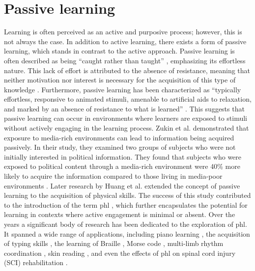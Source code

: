 \section{Passive learning}
Learning is often perceived as an active and purposive process; however, this is not always the case. In addition to active learning, there exists a form of passive learning, which stands in contrast to the active approach. Passive learning is often described as being \enquote{caught rather than taught} \cite{krugman1970passive}, emphasizing its effortless nature. This lack of effort is attributed to the absence of resistance, meaning that neither motivation nor interest is necessary for the acquisition of this type of knowledge \cite{Zukin1984}.
Furthermore, passive learning has been characterized as “typically effortless, responsive to animated stimuli, amenable to artificial aids to relaxation, and marked by an absence of resistance to what is learned” \cite{Huang2008,krugman1970passive}. This suggests that passive learning can occur in environments where learners are exposed to stimuli without actively engaging in the learning process.
Zukin et al. \cite{Zukin1984} demonstrated that exposure to media-rich environments can lead to information being acquired passively. In their study, they examined two groups of subjects who were not initially interested in political information. They found that subjects who were exposed to political content through a media-rich environment were 40\% more likely to acquire the information compared to those living in media-poor environments \cite{zukin1984passive, Huang2008}.
Later research by Huang et al. \cite{Huang2008} extended the concept of passive learning to the acquisition of physical skills. The success of this study contributed to the introduction of the term \gls{phl} \cite{Pescara2019}, which further encapsulates the potential for learning in contexts where active engagement is minimal or absent.
Over the years a significant body of research has been dedicated to the exploration of \gls{phl}. It spanned a wide range of applications, including piano learning \cite{Huang2008, Kohlsdorf2010, Seim2015b, Donchev2021, Fang2023a, Fang2023}, the acquisition of typing skills \cite{Seim2014, Seim2017, Seim2014a, Learning2024}, the learning of Braille \cite{Seim2014a, Learning2024}, Morse code \cite{Seim2016a, Seim2018, Pescara2019}, multi-limb rhythm coordination \cite{Bouwer2011, Holland2010}, skin reading \cite{Luzhnica2016, Luzhnica2018}, and even the effects of \gls{phl} on spinal cord injury (SCI) rehabilitation \cite{Markow2010}.


